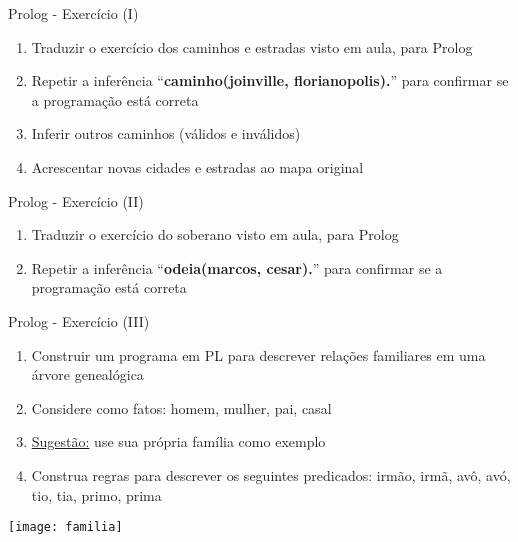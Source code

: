 \begin{frame}[t]{Prolog - Exercício (I)}
	\begin{enumerate}
	\item Traduzir o exercício dos caminhos e estradas visto em aula, para Prolog
	\item Repetir a inferência ``{\bf caminho(joinville, florianopolis).}'' para confirmar se a programação está correta
	\item Inferir outros caminhos (válidos e inválidos)
	\item Acrescentar novas cidades e estradas ao mapa original
	\end{enumerate}
\end{frame}

\begin{frame}[t]{Prolog - Exercício (II)}
	\begin{enumerate}
	\item Traduzir o exercício do soberano visto em aula, para Prolog
	\item Repetir a inferência ``{\bf odeia(marcos, cesar).}'' para confirmar se a programação está correta
	\end{enumerate}
\end{frame}

\begin{frame}[t]{Prolog - Exercício (III)}
	\begin{enumerate}
	\item Construir um programa em PL para descrever relações familiares em uma árvore genealógica
	\item Considere como fatos: homem, mulher, pai, casal
	\item \underline{Sugestão:} use sua própria família como exemplo
	\item Construa regras para descrever os seguintes predicados: irmão, irmã, avô, avó, tio, tia, primo, prima
	\end{enumerate}

	\vskip 0.3cm

	\begin{center}
	\texttt{[image: familia]}
	\end{center}
\end{frame}

